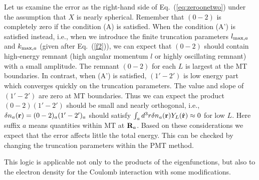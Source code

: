 \documentclass[a4paper,10pt,aip,onecolumn,amsmath,amssymb,floatfix,rmp]{revtex4-1}
\newcommand{\bfr}{{\bf r}}
\newcommand{\bfR}{{\bf R}}
\newcommand{\req}[1]{\mbox{Eq.~\!(\ref{#1})}}
\begin{document}
Let us examine the error as the right-hand side of
\req{eq:zeroonetwo} under the assumption that $X$ is nearly spherical.
Remember that $(0-2)$ is completely zero if the condition (A) is
satisfied. When the condition (A') is satisfied instead, 
i.e., when we introduce the finite truncation parameters 
$l_{{\rm max},a}$ and $k_{{\rm max},a}$ (given after \req{f2}), 
we can expect that $(0-2)$ should contain high-energy remnant
(high angular momentum $l$ or highly oscillating remnant) with a small amplitude.
The remnant $(0-2)$ for each $L$ is largest at the MT boundaries.
In contrast, when (A') is satisfied, $(1'-2')$ is low energy part which  
converges quickly on the truncation parameters. 
The value and slope of $(1'-2')$ are zero at MT boundaries.
Thus we can expect the product $(0-2)(1'-2')$ should be small and
nearly orthogonal, i.e.,
$\delta n_a(\bfr)=(0-2)_a(1'-2')_a$ should satisfy $\int_a d^3 r\delta
n_a(\bfr)Y_L(\hat{\bfr}) \approx 0$ for low $L$.
Here suffix $a$ means quantities within MT at $\bfR_a$.
Based on these considerations we expect that the error affects little 
the total energy.
This can be checked by changing the truncation parameters within the PMT method.

This logic is applicable not only to the products of the eigenfunctions, 
but also to the electron density for the Coulomb interaction 
with some modifications.


\end{document}
